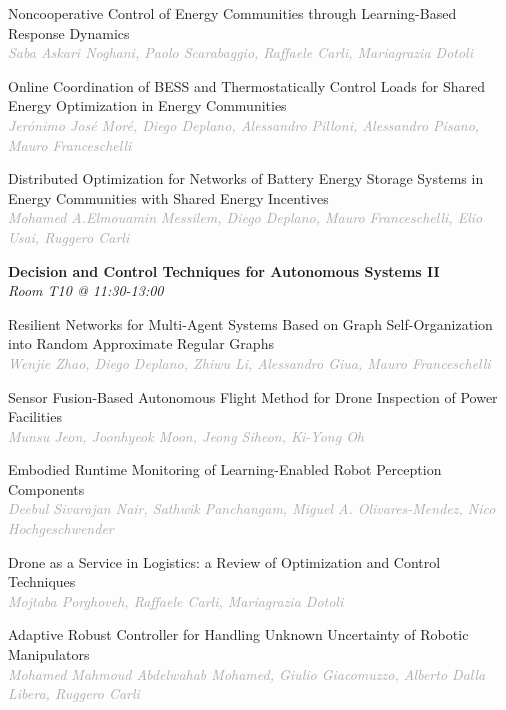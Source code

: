 \begin{multicols*}{2}
\small Noncooperative Control of Energy Communities through Learning-Based Response Dynamics\\ 
\footnotesize \textcolor{darkgray}{\textit{Saba Askari Noghani, Paolo  Scarabaggio, Raffaele  Carli, Mariagrazia  Dotoli}}

\small Online Coordination of BESS and Thermostatically Control Loads for Shared Energy Optimization in Energy Communities\\ 
\footnotesize \textcolor{darkgray}{\textit{Jerónimo José Moré, Diego  Deplano, Alessandro  Pilloni, Alessandro  Pisano, Mauro  Franceschelli}}

\small Distributed Optimization for Networks of Battery Energy Storage Systems in Energy Communities with Shared Energy Incentives\\ 
\footnotesize \textcolor{darkgray}{\textit{Mohamed A.Elmouamin Messilem, Diego  Deplano, Mauro  Franceschelli, Elio  Usai, Ruggero  Carli}}

\normalsize \textbf{Decision and Control Techniques for Autonomous Systems II}\\
\small \textit{Room T10 @ 11:30-13:00}

\small Resilient Networks for Multi-Agent Systems Based on Graph Self-Organization into Random Approximate Regular Graphs\\ 
\footnotesize \textcolor{darkgray}{\textit{Wenjie Zhao, Diego  Deplano, Zhiwu  Li, Alessandro  Giua, Mauro  Franceschelli}}

\small Sensor Fusion-Based Autonomous Flight Method for Drone Inspection of Power Facilities\\ 
\footnotesize \textcolor{darkgray}{\textit{Munsu Jeon, Joonhyeok  Moon, Jeong  Siheon, Ki-Yong  Oh}}

\small Embodied Runtime Monitoring of Learning-Enabled Robot Perception Components\\ 
\footnotesize \textcolor{darkgray}{\textit{Deebul Sivarajan Nair, Sathwik  Panchangam, Miguel A.  Olivares-Mendez, Nico  Hochgeschwender}}

\small Drone as a Service in Logistics: a Review of Optimization and Control Techniques\\ 
\footnotesize \textcolor{darkgray}{\textit{Mojtaba Porghoveh, Raffaele  Carli, Mariagrazia  Dotoli}}

\small Adaptive Robust Controller for Handling Unknown Uncertainty of Robotic Manipulators\\ 
\footnotesize \textcolor{darkgray}{\textit{Mohamed Mahmoud Abdelwahab Mohamed, Giulio  Giacomuzzo, Alberto  Dalla Libera, Ruggero  Carli}}


\end{multicols*}
